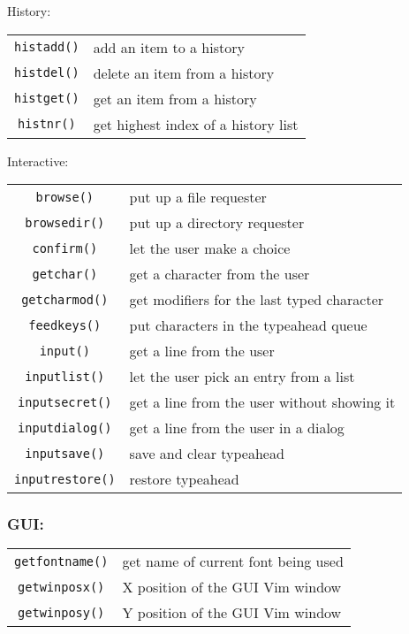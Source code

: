 History:
\label{history-functions}
\begin{center} \begin{tabular}{c l}
				\verb!histadd()! & add an item to a history \\
				\verb!histdel()! & delete an item from a history \\
				\verb!histget()! & get an item from a history \\
				\verb!histnr()! & get highest index of a history list \\
\end{tabular} \end{center}

Interactive:
\label{interactive-functions}
\begin{center} \begin{tabular}{c l}
				\verb!browse()! & put up a file requester \\
				\verb!browsedir()! & put up a directory requester \\
				\verb!confirm()! & let the user make a choice \\
				\verb!getchar()! & get a character from the user \\
				\verb!getcharmod()! & get modifiers for the last typed character \\
				\verb!feedkeys()! & put characters in the typeahead queue \\
				\verb!input()! & get a line from the user \\
				\verb!inputlist()! & let the user pick an entry from a list \\
				\verb!inputsecret()! & get a line from the user without showing it \\
				\verb!inputdialog()! & get a line from the user in a dialog \\
				\verb!inputsave()! & save and clear typeahead \\
				\verb!inputrestore()! & restore typeahead \\
\end{tabular} \end{center}

\subsubsection{GUI:}
\label{gui-functions}
\begin{center} \begin{tabular}{c l}
				\verb!getfontname()! & get name of current font being used \\
				\verb!getwinposx()! & X position of the GUI Vim window \\
				\verb!getwinposy()! & Y position of the GUI Vim window \\
\end{tabular} \end{center}

